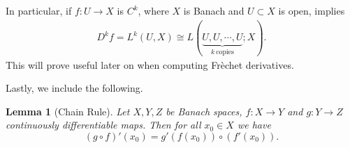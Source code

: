 \documentclass[12pt,reqno]{amsart}
\numberwithin{equation}{section}  %
\newtheorem{lemma}[theorem]{Lemma}
\renewcommand{\cref}{\Cref} %
\begin{document}
%
%
\begin{framed}
In particular, if $f: U \to X$ is $C^{k}$, where $X$ is Banach and $U
\subset X$ is open, \cref{lem:iso} implies
%
%
\begin{equation*}
\begin{split}
D^{k}f = L^{k}(U, X) \cong L(\underbrace{U, U, \cdots, U}_{k \ \text{copies}}; X).
\end{split}
\end{equation*}
%
This will prove useful later on when computing Fr\`echet derivatives.
%
\end{framed}
%
Lastly, we include the following.
%
%
\begin{lemma}[Chain Rule]
Let $X,Y,Z$ be Banach spaces, $f: X \to Y$ and $g: Y \to Z$
continuously differentiable maps. Then for all $x_0 \in X$ we have
%
\begin{equation*} (g \circ f)' (x_0) = g'(f(x_0)) \circ (f'(x_0)).
\end{equation*} 
%
\end{lemma}
\end{document}

